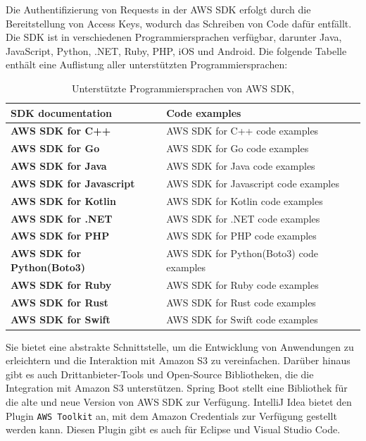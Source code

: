 Die Authentifizierung von Requests in der AWS SDK erfolgt durch die Bereitstellung von Access Keys, wodurch das Schreiben von Code dafür entfällt. Die SDK ist in verschiedenen Programmiersprachen verfügbar, darunter Java, JavaScript, Python, .NET, Ruby, PHP, iOS und Android. Die folgende Tabelle enthält eine Auflistung aller unterstützten Programmiersprachen:

\begin{table}[!h]
\centering
\begin{tabular}{ |p{5.5cm}|p{7cm}| }
\hline
\rowcolor{gray!30}
\textbf{SDK documentation} & \textbf{Code examples}\\
\hline
\textbf{AWS SDK for C++} & AWS SDK for C++ code examples\\
\textbf{AWS SDK for Go} & AWS SDK for Go code examples\\
\textbf{AWS SDK for Java}   & AWS SDK for Java code examples\\
\textbf{AWS SDK for Javascript}  & AWS SDK for Javascript code examples\\
\textbf{AWS SDK for Kotlin} & AWS SDK for Kotlin code examples\\
\textbf{AWS SDK for .NET} & AWS SDK for .NET code examples\\
\textbf{AWS SDK for PHP} & AWS SDK for PHP code examples\\
\textbf{AWS SDK for Python(Boto3)} & AWS SDK for Python(Boto3) code examples\\
\textbf{AWS SDK for Ruby} & AWS SDK for Ruby code examples\\
\textbf{AWS SDK for Rust} & AWS SDK for Rust code examples\\
\textbf{AWS SDK for Swift} & AWS SDK for Swift code examples\\
\hline
\end{tabular}
\caption{Unterstützte Programmiersprachen von AWS SDK, }
\end{table}

Sie bietet eine abstrakte Schnittstelle, um die Entwicklung von Anwendungen zu erleichtern und die Interaktion mit Amazon S3 zu vereinfachen. Darüber hinaus gibt es auch Drittanbieter-Tools und Open-Source Bibliotheken, die die Integration mit Amazon S3 unterstützen. Spring Boot stellt eine Bibliothek für die alte und neue Version von AWS SDK zur Verfügung. IntelliJ Idea bietet den Plugin \verb|AWS Toolkit| an, mit dem Amazon Credentials zur Verfügung gestellt werden kann. Diesen Plugin gibt es auch für Eclipse und Visual Studio Code.\\


